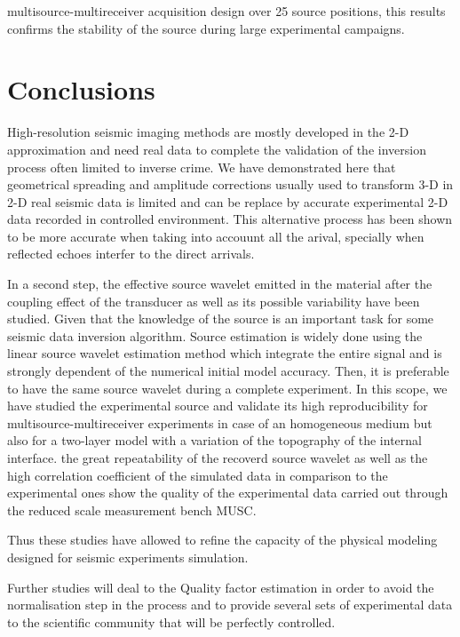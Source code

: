 \documentclass[manuscript,revised]{geophysics}
\newcommand{\twod}{2-D }
\newcommand{\thrd}{3-D }
\begin{document}
multisource-multireceiver acquisition design over 25 source positions, this results confirms the stability of the source during large experimental campaigns.     


\section{Conclusions}

\noindent High-resolution seismic imaging methods are mostly developed in the \twod approximation and need real data to complete the validation of the inversion process often limited to inverse crime. We have demonstrated here that geometrical spreading and amplitude corrections usually used to transform \thrd in \twod real seismic data is limited and can be replace by accurate experimental \twod data recorded in controlled environment. This alternative process has been shown to be more accurate when taking into accouunt all the arival, specially when reflected echoes interfer to the direct arrivals.

\noindent In a second step, the effective source wavelet emitted in the material after the coupling effect of the transducer as well as its possible variability have been studied. Given that the knowledge of the source is an important task for some seismic data inversion algorithm. Source estimation is widely done using the linear source wavelet estimation method which integrate the entire signal and is strongly dependent of the numerical initial model accuracy. Then, it is preferable to have the same source wavelet during a complete experiment. In this scope, we have studied the experimental source and validate its high reproducibility for multisource-multireceiver experiments in case of an homogeneous medium but also for a two-layer model with a variation of the topography of the internal interface. the great repeatability of the recoverd source wavelet as well as the high correlation coefficient of the simulated data in comparison to the experimental ones show the quality of the experimental data carried out through the reduced scale measurement bench MUSC. 
 
\noindent  Thus these studies have allowed to refine the capacity of the physical modeling designed for seismic experiments simulation. 

\noindent Further studies will deal to the Quality factor estimation in order to avoid the normalisation step in the process and to provide several sets of experimental data to the scientific community that will be perfectly controlled. 
\end{document}
